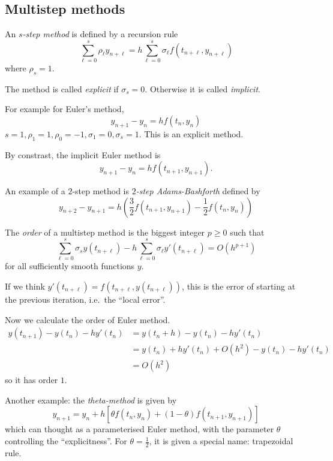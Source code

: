 \documentclass[a4paper]{article}
\begin{document}
\subsection{Multistep methods}

An \emph{\(s\)-step method} is defined by a recursion rule
\begin{equation}
  \label{eqn:multi-step}
  \sum_{\ell = 0}^s \rho_\ell y_{n + \ell} = h \sum_{\ell = 0}^s \sigma_\ell f(t_{n + \ell}, y_{n + \ell})
\end{equation}
where \(\rho_s = 1\).

The method is called \emph{explicit} if \(\sigma_s = 0\). Otherwise it is called \emph{implicit}.

For example for Euler's method,
\[
  y_{n + 1} - y_n = hf(t_n, y_n)
\]
\(s = 1, \rho_1 = 1, \rho_0 = -1, \sigma_1 = 0, \sigma_s = 1\).
This is an explicit method.

By constrast, the implicit Euler method is
\[
  y_{n + 1} - y_n = hf(t_{n + 1}, y_{n + 1}).
\]

An example of a \(2\)-step method is \emph{\(2\)-step Adams-Bashforth} defined by
\[
  y_{n + 2} - y_{n + 1} = h \left( \frac{3}{2}f(t_{n + 1}, y_{n + 1}) - \frac{1}{2}f(t_n, y_n) \right)
\]

\begin{definition}[Order]
  The \emph{order} of a multistep method is the biggest integer \(p \geq 0\) such that
  \[
    \sum_{\ell = 0}^s \sigma_s y(t_{n + \ell}) - h \sum_{\ell = 0}^s \sigma_\ell y'(t_{n + \ell}) = O(h^{p + 1})
  \]
  for all sufficiently smooth functions \(y\).
\end{definition}

If we think \(y'(t_{n + \ell}) = f(t_{n + \ell}, y(t_{n + \ell}))\), this is the error of starting at the previous iteration, i.e.\ the ``local error''.

Now we calculate the order of Euler method.
\begin{align*}
  y(t_{n + 1}) - y(t_n) - hy'(t_n)
  &= y(t_n + h) - y(t_n) - hy'(t_n) \\
  &= y(t_n) + hy'(t_n) + O(h^2) - y(t_n) -hy'(t_n) \\
  &= O(h^2)
\end{align*}
so it has order \(1\).

Another example: the \emph{theta-method} is given by
\[
  y_{n + 1} = y_n + h[\theta f(t_n, y_n) + (1 - \theta) f(t_{n + 1}, y_{n + 1})]
\]
which can thought as a parameterised Euler method, with the parameter \(\theta\) controlling the ``explicitness''. For \(\theta = \frac{1}{2}\), it is given a special name: trapezoidal rule.
\end{document}
